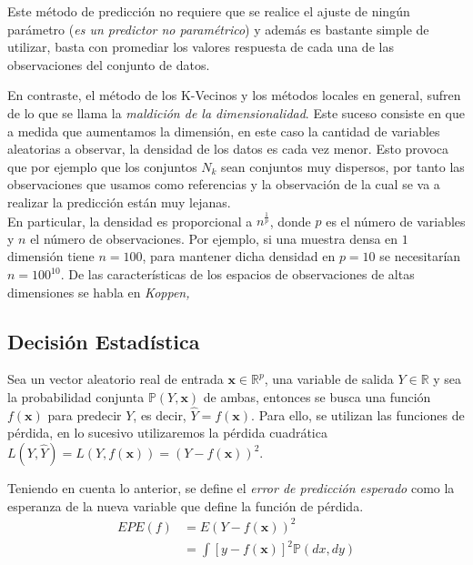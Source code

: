 \noindent Este método de predicción no requiere que se realice el ajuste de ningún parámetro (\textit{es un predictor no paramétrico}) y además es bastante simple de utilizar, basta con promediar los valores respuesta de cada una de las observaciones del conjunto de datos. 

\noindent En contraste, el método de los K-Vecinos y los métodos locales en general, sufren de lo que se llama la \textit{maldición de la dimensionalidad}. Este suceso consiste en que a medida que aumentamos la dimensión, en este caso la cantidad de variables aleatorias a observar, la densidad de los datos es cada vez menor. Esto provoca que por ejemplo que los conjuntos $N_k$ sean conjuntos muy dispersos, por tanto las observaciones que usamos como referencias y la observación de la cual se va a realizar la predicción están muy lejanas.\\
En particular, la densidad es proporcional a $n^{\frac{1}{p}}$, donde $p$ es el número de variables y $n$ el número de observaciones. Por ejemplo, si una muestra densa en $1$ dimensión tiene $n=100$, para mantener dicha densidad en $p=10$ se necesitarían $n = 100^{10}$. 
De las características de los espacios de observaciones de altas dimensiones se habla en \textit{Koppen,}\cite{Koppen 2000}

\subsection{Decisión Estadística}
\noindent Sea un vector aleatorio real de entrada $\textbf{x}\in\mathbb{R}^p$, una variable de salida $Y\in\mathbb{R}$ y sea la probabilidad conjunta $\mathbb{P}(Y,\textbf{x})$ de ambas, entonces se busca una función $f(\textbf{x})$ para predecir $Y$, es decir, $\hat{Y}=f(\textbf{x})$. Para ello, se utilizan las funciones de pérdida, en lo sucesivo utilizaremos la pérdida cuadrática $L(Y,\hat{Y})=L(Y,f(\textbf{x}))=(Y-f(\textbf{x}))^2$. 
\begin{defi}
Teniendo en cuenta lo anterior, se define el \textit{error de predicción esperado} como la esperanza de la nueva variable que define la función de pérdida.
\begin{equation}
\begin{split}
EPE(f)& = E(Y-f(\textbf{x}))^2\\
&= \int [y-f(\textbf{x})]^2\mathbb{P}(dx,dy)
\end{split}
\end{equation}
\end{defi}

